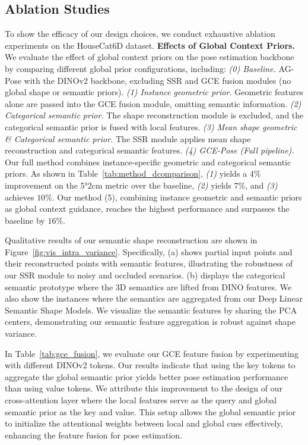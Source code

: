 \subsection{Ablation Studies}
To show the efficacy of our design choices, we conduct exhaustive ablation experiments on the HouseCat6D dataset.
\noindent\textbf{Effects of Global Context Priors.}
We evaluate the effect of global context priors on the pose estimation backbone by comparing different global prior configurations, including: 
\textit{(0) Baseline.} AG-Pose with the DINOv2 backbone, excluding SSR and GCE fusion modules (no global shape or semantic priors). 
\textit{(1) Instance geometric prior.} Geometric features alone are passed into the GCE fusion module, omitting semantic information.
\textit{(2) Categorical semantic prior.} The shape reconstruction module is excluded, and the categorical semantic prior is fused with local features.
\textit{(3) Mean shape geometric \& Categorical semantic prior.} The SSR module applies mean shape reconstruction and categorical semantic features.
\textit{(4) GCE-Pose (Full pipeline).} Our full method combines instance-specific geometric and categorical semantic priors.
As shown in Table~\ref{tab:method_dcomparison}, \textit{(1)} yields a $4\% $ improvement on the 5°2cm metric over the baseline, \textit{(2)} yields $7\%$, and \textit{(3)} achieves $10\%$. Our method (5), combining instance geometric and semantic priors as global context guidance, reaches the highest performance and surpasses the baseline by $16\%$. 

Qualitative results of our semantic shape reconstruction are shown in Figure~\ref{fig:vis_intra_variance}. Specifically, (a) shows partial input points and their reconstructed points with semantic features, illustrating the robustness of our SSR module to noisy and occluded scenarios. (b) displays the categorical semantic prototype where the 3D semantics are lifted from DINO features. We also show the instances where the semantics are aggregated from our Deep Linear Semantic Shape Models. We visualize the semantic features by sharing the PCA centers, demonstrating our semantic feature aggregation is robust against shape variance.

In Table~\ref{tab:gce_fusion}, we evaluate our GCE feature fusion by experimenting with different DINOv2 tokens. Our results indicate that using the key tokens to aggregate the global semantic prior yields better pose estimation performance than using value tokens. We attribute this improvement to the design of our cross-attention layer where the local features serve as the query and global semantic prior as the key and value. This setup allows the global semantic prior to initialize the attentional weights between local and global cues effectively, enhancing the feature fusion for pose estimation.
\vspace{-0.2cm}



